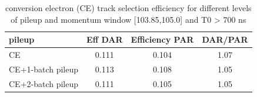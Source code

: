 \begin{table}[h!]
  \label{table:ce_trq_efficiency_vs_pileup_2} 
  \begin{center}
    \begin{tabular}{l|c|c|c} %
      \textbf{pileup}    & Eff DAR &  Efficiency PAR  &  DAR/PAR   \\
      \hline                                                           
      CE                 &  0.111  &   0.104          &  1.07      \\
      CE+1-batch pileup  &  0.113  &   0.108          &  1.05      \\
      CE+2-batch pileup  &  0.111  &   0.105          &  1.05      \\
    \end{tabular}
  \end{center}
  \caption{
    conversion electron (CE) track selection efficiency for different levels of pileup and momentum window [103.85,105.0] 
    and T0 > 700 ns
  }
\end{table}





